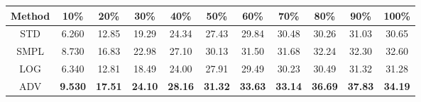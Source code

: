 \documentclass{standalone}
\begin{document}
\begin{tabular}{c|cccccccccc}
      \toprule
      Method & 10\% & 20\% & 30\% & 40\% & 50\% & 60\% & 70\% & 80\% & 90\% & 100\% \\
      \midrule
STD & 6.260 & 12.85 & 19.29 & 24.34 & 27.43 & 29.84 & 30.48 & 30.26 & 31.03 & 30.65\\
SMPL & 8.730 & 16.83 & 22.98 & 27.10 & 30.13 & 31.50 & 31.68 & 32.24 & 32.30 & 32.60\\
LOG & 6.340 & 12.81 & 18.49 & 24.00 & 27.91 & 29.49 & 30.23 & 30.49 & 31.32 & 31.28\\
ADV & \textbf{9.530} & \textbf{17.51} & \textbf{24.10} & \textbf{28.16} & \textbf{31.32} & \textbf{33.63} & \textbf{33.14} & \textbf{36.69} & \textbf{37.83} & \textbf{34.19}\\
  \bottomrule
\end{tabular}
\end{document}
